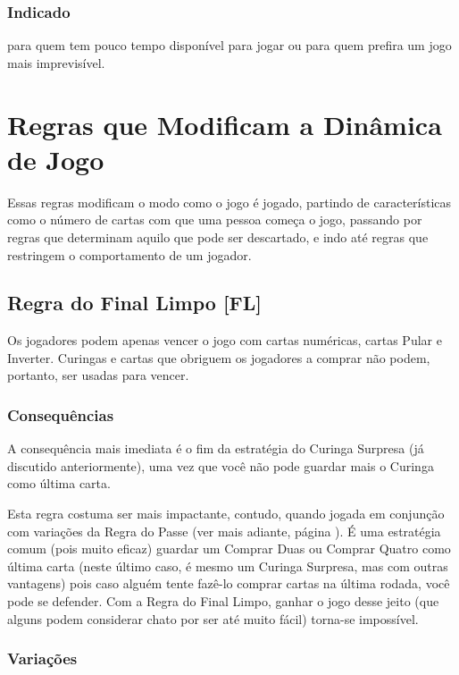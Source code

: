 \subsubsection{Indicado}

para quem tem pouco tempo disponível para jogar ou para quem prefira um jogo mais imprevisível.

\section{Regras que Modificam a Dinâmica de Jogo}

Essas regras modificam o modo como o jogo é jogado, partindo de características como o número de cartas com que uma pessoa começa o jogo, passando por regras que determinam aquilo que pode ser descartado, e indo até regras que restringem o comportamento de um jogador.

\subsection{Regra do Final Limpo [FL]}

Os jogadores podem apenas vencer o jogo com cartas numéricas, cartas Pular e Inverter. Curingas e cartas que obriguem os jogadores a comprar não podem, portanto, ser usadas para vencer.

\subsubsection{Consequências}

A consequência mais imediata é o fim da estratégia do Curinga Surpresa (já discutido anteriormente), uma vez que você não pode guardar mais o Curinga como última carta.

Esta regra costuma ser mais impactante, contudo, quando jogada em conjunção com variações da Regra do Passe (ver mais adiante, página \pageref{regradopasse}). É uma estratégia comum (pois muito eficaz) guardar um Comprar Duas ou Comprar Quatro como última carta (neste último caso, é mesmo um Curinga Surpresa, mas com outras vantagens) pois caso alguém tente fazê-lo comprar cartas na última rodada, você pode se defender. Com a Regra do Final Limpo, ganhar o jogo desse jeito (que alguns podem considerar chato por ser até muito fácil) torna-se impossível.

\subsubsection{Variações}

